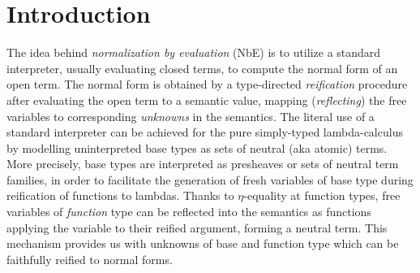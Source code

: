 \documentclass[sigplan,screen,fleqn,review]{acmart} %
\begin{document}



\maketitle

\setlength{\mathindent}{\parindent}


\section{Introduction}
\label{sec:intro}

The idea behind \emph{normalization by evaluation} (NbE) is to utilize a
standard interpreter, usually evaluating closed terms, to compute the
normal form of an open term.
The normal form is obtained by a type-directed \emph{reification}
procedure after evaluating the open term to a semantic value, mapping
(\emph{reflecting})
the free variables to corresponding \emph{unknowns} in the semantics.
The literal use of a standard interpreter
can be achieved for the pure simply-typed lambda-calculus
\cite{bergerSchwichtenberg:lics91,filinski:semaccounttdpe}
by modelling uninterpreted base types as sets of neutral (aka atomic)
terms.   More precisely, base types are interpreted
as presheaves or sets of neutral term
families, in order to facilitate the generation of
fresh variables of base type during
reification of functions to lambdas.
Thanks to $\eta$-equality at function types, free variables of
\emph{function} type can be reflected into the semantics as functions
applying the variable to their reified argument,
forming a neutral term.  This mechanism provides us with unknowns of
base and function type which can be faithfully reified to normal forms.
\end{document}
